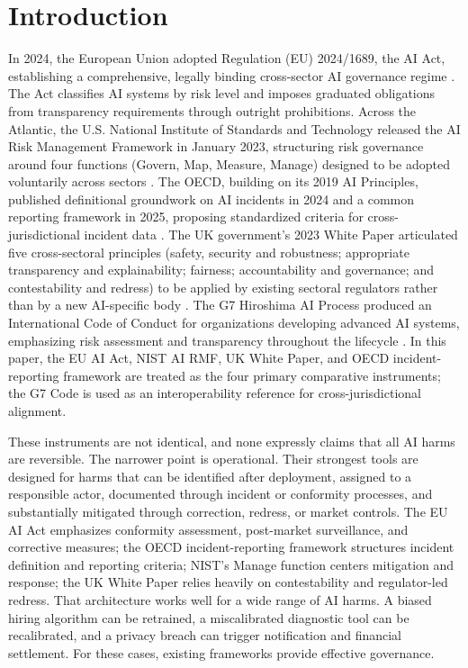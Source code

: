 \documentclass[11pt]{article}
\begin{document}
\section{Introduction}

In 2024, the European Union adopted Regulation (EU) 2024/1689, the AI Act, establishing a comprehensive, legally binding cross-sector AI governance regime \parencite{euaiact2024}. The Act classifies AI systems by risk level and imposes graduated obligations from transparency requirements through outright prohibitions. Across the Atlantic, the U.S. National Institute of Standards and Technology released the AI Risk Management Framework in January 2023, structuring risk governance around four functions (Govern, Map, Measure, Manage) designed to be adopted voluntarily across sectors \parencite{nistrmf2023}. The OECD, building on its 2019 AI Principles, published definitional groundwork on AI incidents in 2024 and a common reporting framework in 2025, proposing standardized criteria for cross-jurisdictional incident data \parencite{oecd2024terms,oecd2025framework}. The UK government's 2023 White Paper articulated five cross-sectoral principles (safety, security and robustness; appropriate transparency and explainability; fairness; accountability and governance; and contestability and redress) to be applied by existing sectoral regulators rather than by a new AI-specific body \parencite{ukwhitepaper2023}. The G7 Hiroshima AI Process produced an International Code of Conduct for organizations developing advanced AI systems, emphasizing risk assessment and transparency throughout the lifecycle \parencite{g7hiroshima2023}. In this paper, the EU AI Act, NIST AI RMF, UK White Paper, and OECD incident-reporting framework are treated as the four primary comparative instruments; the G7 Code is used as an interoperability reference for cross-jurisdictional alignment.

These instruments are not identical, and none expressly claims that all AI harms are reversible. The narrower point is operational. Their strongest tools are designed for harms that can be identified after deployment, assigned to a responsible actor, documented through incident or conformity processes, and substantially mitigated through correction, redress, or market controls. The EU AI Act emphasizes conformity assessment, post-market surveillance, and corrective measures; the OECD incident-reporting framework structures incident definition and reporting criteria; NIST's Manage function centers mitigation and response; the UK White Paper relies heavily on contestability and regulator-led redress. That architecture works well for a wide range of AI harms. A biased hiring algorithm can be retrained, a miscalibrated diagnostic tool can be recalibrated, and a privacy breach can trigger notification and financial settlement. For these cases, existing frameworks provide effective governance.
\end{document}
